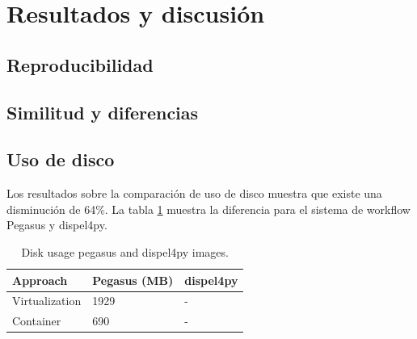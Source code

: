 \section{Resultados y discusión}\label{s5.4}

\subsection{Reproducibilidad}



\subsection{Similitud y diferencias}

\subsection{Uso de disco }

Los resultados sobre la comparación de uso de disco muestra que existe una disminución de 64\%. La tabla \ref{storage-reduce} muestra la diferencia para el sistema de workflow Pegasus y dispel4py.

\begin{table}[]
\begin{tabular}{|l|l|l|}
\hline
Approach       & Pegasus (MB) & dispel4py \\ \hline
Virtualization & 1929         & -  \\ \hline
Container      & 690          &  - \\ \hline
\end{tabular}
\caption{Disk usage pegasus and dispel4py images.}
\label{storage-reduce}
\end{table}


